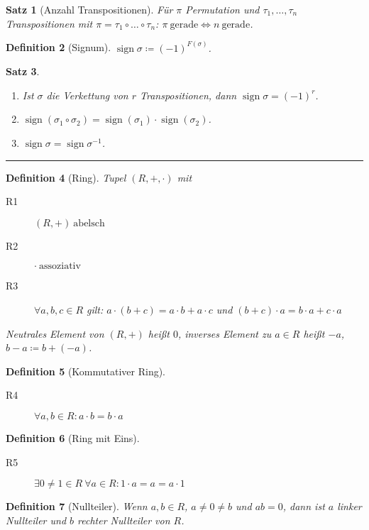 \documentclass[a4paper]{article}
\newcounter{Sec}
\theoremstyle{marginbreak}
\newtheorem{definition}{Definition}[Sec]
\newtheorem{satz}[definition]{Satz}
\DeclareMathOperator{\sign}{sign}
\newcommand{\sep}{%
	\rule{\textwidth}{0.3pt}%
	\stepcounter{Sec}%
	}
\begin{document}
	\begin{satz}[Anzahl Transpositionen]
		Für $\pi$ Permutation und $\tau_1, \ldots, \tau_n$ Transpositionen mit
		$\pi = \tau_1 \circ \ldots \circ \tau_n$: $\pi~\text{gerade} \iff n~\text{gerade}$.
	\end{satz}
	\begin{definition}[Signum]
		$\sign\sigma\coloneqq(-1)^{F(\sigma)}$.
	\end{definition}
	\begin{satz}
		\begin{enumerate}[label=(\alph*)]
			\item Ist $\sigma$ die Verkettung von $r$ Transpositionen, dann $\sign\sigma = (-1)^r$.
			\item $\sign(\sigma_1\circ\sigma_2) = \sign(\sigma_1)\cdot\sign(\sigma_2)$.
			\item $\sign\sigma=\sign\sigma^{-1}$.
		\end{enumerate}
	\end{satz}
	\sep
	\begin{definition}[Ring]
		Tupel $(R, +, \cdot)$ mit
		\begin{description}
			\item[R1] $(R, +)~\text{abelsch}$
			\item[R2] $\cdot~\text{assoziativ}$
			\item[R3] $\forall a, b, c \in R$ gilt: $a\cdot(b + c) = a\cdot b + a\cdot c$ und $(b + c)\cdot a = b\cdot a + c\cdot a$
		\end{description}

		Neutrales Element von $(R, +)$ heißt $0$, inverses Element zu $a \in R$ heißt $-a$, $b - a \coloneqq b + (-a)$.
	\end{definition}
	\begin{definition}[Kommutativer Ring]
		\begin{description}
			\item[R4] $\forall a, b \in R: a \cdot b = b \cdot a$
		\end{description}
	\end{definition}
	\begin{definition}[Ring mit Eins]
		\begin{description}
			\item[R5] $\exists 0 \neq 1 \in R~\forall a \in R: 1 \cdot a = a = a \cdot 1$
		\end{description}
	\end{definition}
	\begin{definition}[Nullteiler]
		Wenn $a, b \in R$, $a \neq 0 \neq b$ und $ab = 0$, dann ist $a$ linker Nullteiler
		und $b$ rechter Nullteiler von $R$.
	\end{definition}
\end{document}
